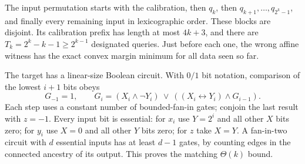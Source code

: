 The input permutation starts with the calibration, then $q_k$, then
$q_{k+1},\ldots,q_{2^k-1}$, and finally every remaining input in
lexicographic order. These blocks are disjoint. Its calibration prefix
has length at most $4k+3$, and there are
$T_k=2^k-k-1\ge2^{k-1}$ designated queries. Just before each one, the
wrong affine witness has the exact convex margin minimum for all data
seen so far.

The target has a linear-size Boolean circuit. With $0/1$ bit notation,
comparison of the lowest $i+1$ bits obeys
\[
 G_{-1}=1,\qquad
 G_i=(X_i\wedge\neg Y_i)\ \vee\
       ((X_i\leftrightarrow Y_i)\wedge G_{i-1}).
\]
Each step uses a constant number of bounded-fan-in gates; conjoin the
last result with $z=-1$. Every input bit is essential: for $x_i$ use
$Y=2^i$ and all other $X$ bits zero; for $y_i$ use $X=0$ and all other
$Y$ bits zero; for $z$ take $X=Y$. A fan-in-two circuit with $d$ essential
inputs has at least $d-1$ gates, by counting edges in the connected
ancestry of its output. This proves the matching $\Theta(k)$ bound.
